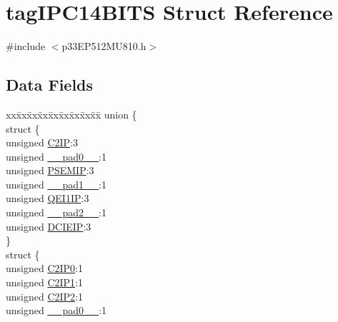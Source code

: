 \hypertarget{structtag_i_p_c14_b_i_t_s}{}\section{tag\+I\+P\+C14\+B\+I\+TS Struct Reference}
\label{structtag_i_p_c14_b_i_t_s}


{\ttfamily \#include $<$p33\+E\+P512\+M\+U810.\+h$>$}

\subsection*{Data Fields}
\begin{DoxyCompactItemize}
\item 
\begin{tabbing}
xx\=xx\=xx\=xx\=xx\=xx\=xx\=xx\=xx\=\kill
union \{\\
\>struct \{\\
\>\>unsigned \hyperlink{structtag_i_p_c14_b_i_t_s_af39bff101af4636d2079c62ff6e4a37a}{C2IP}:3\\
\>\>unsigned \hyperlink{structtag_i_p_c14_b_i_t_s_adf71f3d8410c1f1dbbc96680a92c49af}{\_\_pad0\_\_}:1\\
\>\>unsigned \hyperlink{structtag_i_p_c14_b_i_t_s_ab39736de13d7896c5b9c1e122088fde7}{PSEMIP}:3\\
\>\>unsigned \hyperlink{structtag_i_p_c14_b_i_t_s_acaf2d0924a107ec6e8d2e31febaf66f9}{\_\_pad1\_\_}:1\\
\>\>unsigned \hyperlink{structtag_i_p_c14_b_i_t_s_a3e6a8e803056fe0d993cca4ff407d3fe}{QEI1IP}:3\\
\>\>unsigned \hyperlink{structtag_i_p_c14_b_i_t_s_a4d97cc5f7d51d22fc2bf3eab35c9cb7f}{\_\_pad2\_\_}:1\\
\>\>unsigned \hyperlink{structtag_i_p_c14_b_i_t_s_a39788b09815eb04f8462e4e536393aee}{DCIEIP}:3\\
\>\} \\
\>struct \{\\
\>\>unsigned \hyperlink{structtag_i_p_c14_b_i_t_s_a18a39c1a0447c0c70f8b29aa7e6605fe}{C2IP0}:1\\
\>\>unsigned \hyperlink{structtag_i_p_c14_b_i_t_s_acb6dbd33870bce2e34df8b1684069894}{C2IP1}:1\\
\>\>unsigned \hyperlink{structtag_i_p_c14_b_i_t_s_a754f903e1cd8a21c5913044b8d46b715}{C2IP2}:1\\
\>\>unsigned \hyperlink{structtag_i_p_c14_b_i_t_s_adf71f3d8410c1f1dbbc96680a92c49af}{\_\_pad0\_\_}:1\\

\end{tabbing}
\end{DoxyCompactItemize}
